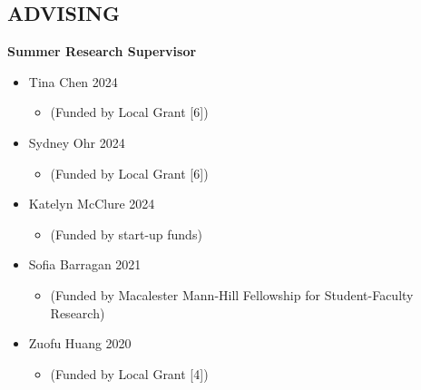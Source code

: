 \documentclass[margin]{res}
\begin{document}
\begin{resume}

\section{ADVISING}	

\textbf{Summer Research Supervisor}
\begin{itemize}
\item Tina Chen \hfill 2024
	\begin{itemize}[leftmargin=-0in] \vspace{-0.2cm}
	\item[]\begin{footnotesize}(Funded by Local Grant [6]) \end{footnotesize}
	\end{itemize}
	
\item Sydney Ohr \hfill 2024 
	\begin{itemize}[leftmargin=-0in] \vspace{-0.2cm}
	\item[]\begin{footnotesize}(Funded by Local Grant [6]) \end{footnotesize}
	\end{itemize}
	
\item Katelyn McClure \hfill 2024 
	\begin{itemize}[leftmargin=-0in] \vspace{-0.2cm}
	\item[]\begin{footnotesize}(Funded by start-up funds) \end{footnotesize}
	\end{itemize}

\item Sofia Barragan \hfill 2021 
	\begin{itemize}[leftmargin=-0in] \vspace{-0.2cm}
	\item[]\begin{footnotesize}(Funded by Macalester Mann-Hill Fellowship for Student-Faculty Research) \end{footnotesize}
	\end{itemize}

\item Zuofu Huang \hfill 2020 
	\begin{itemize}[leftmargin=-0in] \vspace{-0.2cm}
	\item[]\begin{footnotesize}(Funded by Local Grant [4]) \end{footnotesize}
	\end{itemize}
\end{itemize}



\end{resume}
\end{document}
